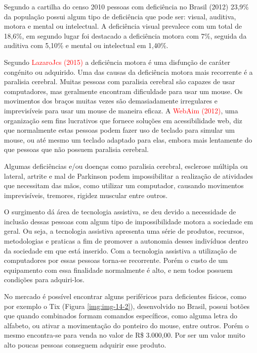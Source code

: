 \documentclass[
	12pt,			%
	openright,		%
	oneside,			%
	a4paper,			%
	chapter=TITLE,		%
	english,			%
	brazil,			%
	]{abntex2}
\begin{document}
Segundo a cartilha do censo 2010 pessoas com deficiência no Brasil (2012) 23,9\% da população possui algum tipo de deficiência que pode ser: visual, auditiva, motora e mental ou intelectual. A deficiência visual prevalece com um total de 18,6\%, em segundo lugar foi destacado a deficiência motora com 7\%, seguida da auditiva com 5,10\% e mental ou intelectual em 1,40\%.

Segundo \textcolor{red}{LazaroJcs (2015)} a deficiência motora é uma disfunção de caráter congénito ou adquirido. Uma das causas da deficiência motora mais recorrente é a paralisia cerebral. Muitas pessoas com paralisia cerebral são capazes de usar computadores, mas geralmente encontram dificuldade para usar um mouse. Os movimentos dos braços muitas vezes são demasiadamente irregulares e imprevisíveis para usar um mouse de maneira eficaz. A \textcolor{red}{WebAim (2012)}, uma organização sem fins lucrativos que fornece soluções em acessibilidade web, diz que normalmente estas pessoas podem fazer uso de teclado para simular um mouse, ou até mesmo um teclado adaptado para elas, embora mais lentamente do que pessoas que não possuem paralisia cerebral.

Algumas deficiências e/ou doenças como paralisia cerebral, esclerose múltipla ou lateral, artrite e mal de Parkinson podem impossibilitar a realização de atividades que necessitam das mãos, como utilizar um computador, causando movimentos imprevisíveis, tremores, rigidez muscular entre outros.

O surgimento dá área de tecnologia assistiva, se deu devido a necessidade de inclusão dessas pessoas com algum tipo de impossibilidade motora a sociedade em geral. Ou seja, a tecnologia assistiva apresenta uma série de produtos, recursos, metodologias e praticas a fim de promover a autonomia desses indivíduos dentro da sociedade em que está inserido. Com a tecnologia assistiva a utilização de computadores por essas pessoas torna-se recorrente. Porém o custo de um equipamento com essa finalidade normalmente é alto, e nem todos possuem condições para adquiri-los.

No mercado é possível encontrar alguns periféricos para deficientes físicos, como por exemplo o Tix (Figura \ref{img:img-14-2}), desenvolvido no Brasil, possui botões que quando combinados formam comandos específicos, como alguma letra do alfabeto, ou ativar a movimentação do ponteiro do mouse, entre outros. Porém o mesmo encontra-se para venda no valor de R\$ 3.000,00. Por ser um valor muito alto poucas pessoas conseguem adquirir esse produto.
\end{document}
